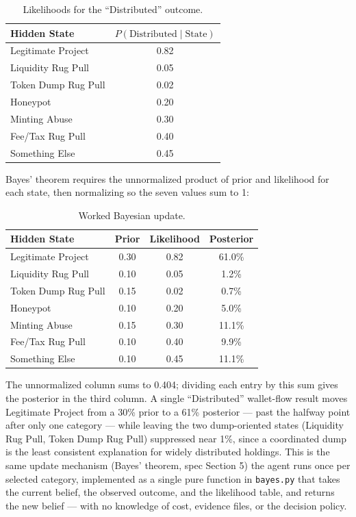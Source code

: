 \documentclass[11pt]{article}
\begin{document}
\begin{table}[h]
\centering
\begin{tabular}{lc}
\toprule
\textbf{Hidden State} & \textbf{$P(\text{Distributed}\mid\text{State})$}\\
\midrule
Legitimate Project & 0.82\\
Liquidity Rug Pull & 0.05\\
Token Dump Rug Pull & 0.02\\
Honeypot & 0.20\\
Minting Abuse & 0.30\\
Fee/Tax Rug Pull & 0.40\\
Something Else & 0.45\\
\bottomrule
\end{tabular}
\caption{Likelihoods for the ``Distributed'' outcome.}
\end{table}

Bayes' theorem requires the unnormalized product of prior and likelihood for each state, then normalizing so the seven values sum to 1:

\begin{table}[h]
\centering
\small
\begin{tabular}{lccc}
\toprule
\textbf{Hidden State} & \textbf{Prior} & \textbf{Likelihood} & \textbf{Posterior}\\
\midrule
Legitimate Project & 0.30 & 0.82 & 61.0\%\\
Liquidity Rug Pull & 0.10 & 0.05 & 1.2\%\\
Token Dump Rug Pull & 0.15 & 0.02 & 0.7\%\\
Honeypot & 0.10 & 0.20 & 5.0\%\\
Minting Abuse & 0.15 & 0.30 & 11.1\%\\
Fee/Tax Rug Pull & 0.10 & 0.40 & 9.9\%\\
Something Else & 0.10 & 0.45 & 11.1\%\\
\bottomrule
\end{tabular}
\caption{Worked Bayesian update.}
\end{table}

The unnormalized column sums to 0.404; dividing each entry by this sum gives the posterior in the third column. A single ``Distributed'' wallet-flow result moves Legitimate Project from a 30\% prior to a 61\% posterior --- past the halfway point after only one category --- while leaving the two dump-oriented states (Liquidity Rug Pull, Token Dump Rug Pull) suppressed near 1\%, since a coordinated dump is the least consistent explanation for widely distributed holdings. This is the same update mechanism (Bayes' theorem, spec Section 5) the agent runs once per selected category, implemented as a single pure function in \texttt{bayes.py} that takes the current belief, the observed outcome, and the likelihood table, and returns the new belief --- with no knowledge of cost, evidence files, or the decision policy.
\end{document}
